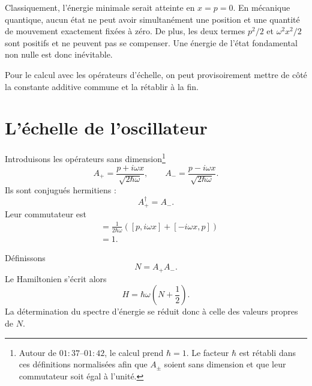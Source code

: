 Classiquement, l’énergie minimale serait atteinte en \(x=p=0\). En mécanique quantique, aucun état ne peut avoir simultanément une position et une quantité de mouvement exactement fixées à zéro. De plus, les deux termes \(p^2/2\) et \(\omega^2x^2/2\) sont positifs et ne peuvent pas se compenser. Une énergie de l’état fondamental non nulle est donc inévitable.

Pour le calcul avec les opérateurs d’échelle, on peut provisoirement mettre de côté la constante additive commune et la rétablir à la fin.

\begin{classroomqa}\end{classroomqa}

\section{L’échelle de l’oscillateur}

Introduisons les opérateurs sans dimension\footnote{Autour de \(01{:}37\)--\(01{:}42\), le calcul prend \(\hbar=1\). Le facteur \(\hbar\) est rétabli dans ces définitions normalisées afin que \(A_\pm\) soient sans dimension et que leur commutateur soit égal à l’unité.}
\begin{equation}
A_+=\frac{p+i\omega x}{\sqrt{2\hbar\omega}},
\qquad
A_-=\frac{p-i\omega x}{\sqrt{2\hbar\omega}}.
\end{equation}
Ils sont conjugués hermitiens :
\begin{equation}
A_+^\dagger=A_-.
\end{equation}
Leur commutateur est
\begin{align}
[A_-,A_+]
&=\frac{1}{2\hbar\omega}
\left([p,i\omega x]+[-i\omega x,p]\right) \\
&=1.
\end{align}

Définissons
\begin{equation}
N=A_+A_-.
\end{equation}
Le Hamiltonien s’écrit alors
\begin{equation}
H=\hbar\omega\left(N+\frac{1}{2}\right).
\end{equation}
La détermination du spectre d’énergie se réduit donc à celle des valeurs propres de \(N\).

